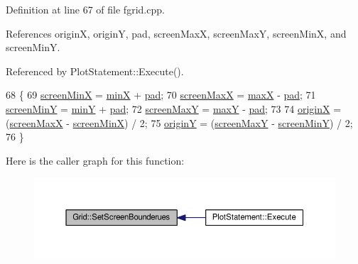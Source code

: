 Definition at line 67 of file fgrid.\+cpp.



References originX, originY, pad, screen\+MaxX, screen\+MaxY, screen\+MinX, and screen\+MinY.



Referenced by Plot\+Statement\+::\+Execute().


\begin{DoxyCode}
68 \{
69     \hyperlink{classGrid_a5876a8eaa41c1ac49fec464475d7cbb6}{screenMinX} = \hyperlink{classGrid_a70c775fad6a2cfa910a7e1f8c5b3e9b2}{minX} + \hyperlink{classGrid_a2bf4a157b130ed18d78d2e9a6760a6a8}{pad};
70     \hyperlink{classGrid_ad662ef34930a80011080a45a975cae79}{screenMaxX} = \hyperlink{classGrid_ad093fee95a663d4b82c85bea9a1241ec}{maxX} - \hyperlink{classGrid_a2bf4a157b130ed18d78d2e9a6760a6a8}{pad};
71     \hyperlink{classGrid_a18e1493a917be10c5454f44e1114fbdc}{screenMinY} = \hyperlink{classGrid_af592907852d983fe13ef9581ffd77e6b}{minY} + \hyperlink{classGrid_a2bf4a157b130ed18d78d2e9a6760a6a8}{pad};
72     \hyperlink{classGrid_a9ff802b20cf95e066646d24aa284a547}{screenMaxY} = \hyperlink{classGrid_acca4c514021d9f6733579b699ac68436}{maxY} - \hyperlink{classGrid_a2bf4a157b130ed18d78d2e9a6760a6a8}{pad};
73 
74     \hyperlink{classGrid_a0c0e10fa32d7fa78985cba0df1a34a0f}{originX} = (\hyperlink{classGrid_ad662ef34930a80011080a45a975cae79}{screenMaxX} - \hyperlink{classGrid_a5876a8eaa41c1ac49fec464475d7cbb6}{screenMinX}) / 2;
75     \hyperlink{classGrid_add0854295a7e36ab9f77889862bfda0e}{originY} = (\hyperlink{classGrid_a9ff802b20cf95e066646d24aa284a547}{screenMaxY} - \hyperlink{classGrid_a18e1493a917be10c5454f44e1114fbdc}{screenMinY}) / 2;
76 \}
\end{DoxyCode}


Here is the caller graph for this function\+:
\nopagebreak
\begin{figure}[H]
\begin{center}
\leavevmode
\includegraphics[width=350pt]{d0/daf/classGrid_ac5386f4f62d3aae6a518fa11d25c7e59_icgraph}
\end{center}
\end{figure}




